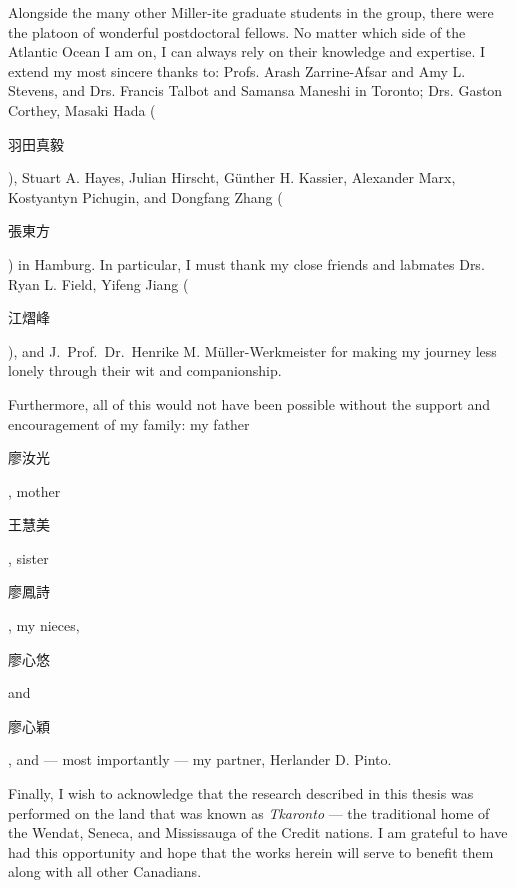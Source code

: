 \documentclass[12pt]{ut-thesis}
\begin{document}
\begin{preliminary}
\begin{acknowledgements}
      Alongside the many other Miller-ite graduate students in the group,
      there were the platoon of wonderful postdoctoral fellows.
      No matter which side of the Atlantic Ocean I am on,
      I can always rely on their knowledge and expertise.
      I extend my most sincere thanks to: Profs. Arash Zarrine-Afsar and Amy L. Stevens,
      and Drs. Francis Talbot and Samansa Maneshi in Toronto;
      Drs. Gaston Corthey,  Masaki Hada (\begin{CJK*}{UTF8}{bkai}羽田真毅\end{CJK*}),
      Stuart A. Hayes, Julian Hirscht, G\"{u}nther H. Kassier, Alexander Marx, Kostyantyn Pichugin,
      and Dongfang Zhang (\begin{CJK*}{UTF8}{bkai}張東方\end{CJK*}) in Hamburg.
      In particular, I must thank my close friends and labmates Drs. Ryan L. Field,
      Yifeng Jiang (\begin{CJK*}{UTF8}{bkai}江熠峰\end{CJK*}), and
      J.~Prof.~Dr.~Henrike M. M\"{u}ller-Werkmeister
      for making my journey less lonely through their wit and companionship.

      Furthermore, all of this would not have been possible without the support and encouragement
      of my family: my father \begin{CJK*}{UTF8}{bkai}廖汝光\end{CJK*},
      mother \begin{CJK*}{UTF8}{bkai}王慧美\end{CJK*}, sister \begin{CJK*}{UTF8}{bkai}廖鳳詩\end{CJK*},
      my nieces, \begin{CJK*}{UTF8}{bkai}廖心悠\end{CJK*} and \begin{CJK*}{UTF8}{bkai}廖心穎\end{CJK*},
      and --- most importantly --- my partner, Herlander D. Pinto.

      Finally, I wish to acknowledge that the research described in this thesis was performed
      on the land that was known as \emph{Tkaronto} ---
      the traditional home of the Wendat, Seneca, and Mississauga of the Credit nations.
      I am grateful to have had this opportunity and hope that the works herein
      will serve to benefit them along with all other Canadians.


\end{acknowledgements}
\end{preliminary}
\end{document}
